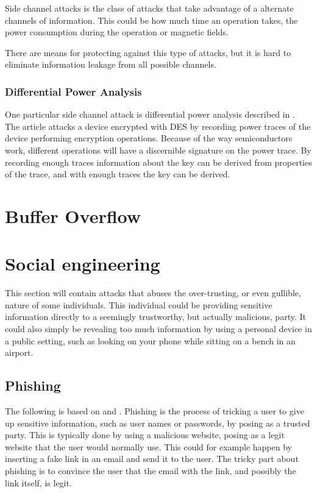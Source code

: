 Side channel attacks is the class of attacks that take advantage of a alternate channels of information.
This could be how much time an operation takes, the power consumption during the operation or magnetic fields.

There are means for protecting against this type of attacks, but it is hard to eliminate information leakage from all possible channels.

\subsubsection{Differential Power Analysis}\label{attack:dpa}
One particular side channel attack is differential power analysis described in \citet{DPA}.
The article attacks a device encrypted with DES by recording power traces of the device performing encryption operations.
Because of the way semiconductors work, different operations will have a discernible signature on the power trace.
By recording enough traces information about the key can be derived from properties of the trace, and with enough traces the key can be derived.

\section{Buffer Overflow}\label{attack:bufferoverflow}


\section{Social engineering}
This section will contain attacks that abuses the over-trusting, or even gullible, nature of some individuals.
This individual could be providing sensitive information directly to a seemingly trustworthy, but actually malicious, party.
It could also simply be revealing too much information by using a personal device in a public setting, such as looking on your phone while sitting on a bench in an airport.

\subsection{Phishing}\label{attack:phishing}

The following is based on \citet{security_engineering_ross_anderson} and \citet{dhamija2006phishing}.
Phishing is the process of tricking a user to give up sensitive information, such as user names or passwords, by posing as a trusted party.
This is typically done by using a malicious website, posing as a legit website that the user would normally use.
This could for example happen by inserting a fake link in an email and send it to the user.
The tricky part about phishing is to convince the user that the email with the link, and possibly the link itself, is legit.

